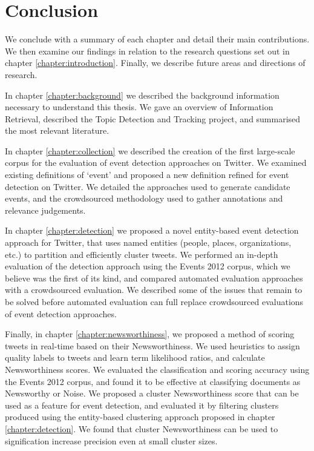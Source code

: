 
\chapter{Conclusion}
\label{chapter:Conclusion}
We conclude with a summary of each chapter and detail their main contributions. We then examine our findings in relation to the research questions set out in chapter \ref{chapter:introduction}. Finally, we describe future areas and directions of research.

In chapter \ref{chapter:background} we described the background information necessary to understand this thesis. We gave an overview of Information Retrieval, described the Topic Detection and Tracking project, and summarised the most relevant literature.

In chapter \ref{chapter:collection} we described the creation of the first large-scale corpus for the evaluation of event detection approaches on Twitter.
We examined existing definitions of `event' and proposed a new definition refined for event detection on Twitter.
We detailed the approaches used to generate candidate events, and the crowdsourced methodology used to gather annotations and relevance judgements.

In chapter \ref{chapter:detection} we proposed a novel entity-based event detection approach for Twitter, that uses named entities (people, places, organizations, etc.) to partition and efficiently cluster tweets.
We performed an in-depth evaluation of the detection approach using the Events 2012 corpus, which we believe was the first of its kind, and compared automated evaluation approaches with a crowdsourced evaluation. We described some of the issues that remain to be solved before automated evaluation can full replace crowdsourced evaluations of event detection approaches.

Finally, in chapter \ref{chapter:newsworthiness}, we proposed a method of scoring tweets in real-time based on their Newsworthiness.
We used heuristics to assign quality labels to tweets and learn term likelihood ratios, and calculate Newsworthiness scores.
We evaluated the classification and scoring accuracy using the Events 2012 corpus, and found it to be effective at classifying documents as Newsworthy or Noise.
We proposed a cluster Newsworthiness score that can be used as a feature for event detection, and evaluated it by filtering clusters produced using the entity-based clustering approach proposed in chapter  \ref{chapter:detection}. We found that cluster Newsworthiness can be used to signification increase precision even at small cluster sizes.

